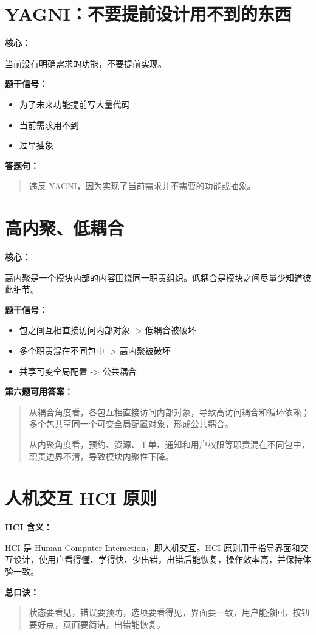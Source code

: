 \documentclass[UTF8,zihao=-4]{ctexart}
\newcommand{\principle}[1]{%
  \section*{\color{TitleBlue}#1}
}
\newcommand{\labeltext}[1]{%
  \textbf{#1}
}
\newenvironment{answerbox}{%
  \begin{quote}\small\color{TextGray}
}{%
  \end{quote}
}
\begin{document}
\principle{YAGNI：不要提前设计用不到的东西}

\labeltext{核心：}
当前没有明确需求的功能，不要提前实现。

\labeltext{题干信号：}
\begin{itemize}
  \item 为了未来功能提前写大量代码
  \item 当前需求用不到
  \item 过早抽象
\end{itemize}

\labeltext{答题句：}
\begin{answerbox}
违反 YAGNI，因为实现了当前需求并不需要的功能或抽象。
\end{answerbox}

\principle{高内聚、低耦合}

\labeltext{核心：}
高内聚是一个模块内部的内容围绕同一职责组织。低耦合是模块之间尽量少知道彼此细节。

\labeltext{题干信号：}
\begin{itemize}
  \item 包之间互相直接访问内部对象 -> 低耦合被破坏
  \item 多个职责混在不同包中 -> 高内聚被破坏
  \item 共享可变全局配置 -> 公共耦合
\end{itemize}

\labeltext{第六题可用答案：}
\begin{answerbox}
从耦合角度看，各包互相直接访问内部对象，导致高访问耦合和循环依赖；多个包共享同一个可变全局配置对象，形成公共耦合。

从内聚角度看，预约、资源、工单、通知和用户权限等职责混在不同包中，职责边界不清，导致模块内聚性下降。
\end{answerbox}

\clearpage
\section*{\color{TitleBlue}人机交互 HCI 原则}

\labeltext{HCI 含义：}
HCI 是 Human-Computer Interaction，即人机交互。HCI 原则用于指导界面和交互设计，使用户看得懂、学得快、少出错，出错后能恢复，操作效率高，并保持体验一致。

\labeltext{总口诀：}
\begin{answerbox}
状态要看见，错误要预防，选项要看得见，界面要一致，用户能撤回，按钮要好点，页面要简洁，出错能恢复。
\end{answerbox}
\end{document}
